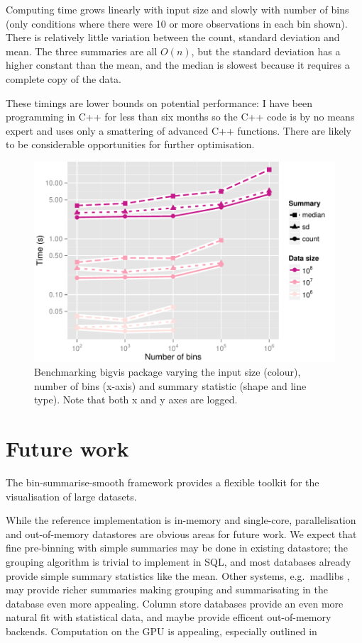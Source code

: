 \documentclass[journal]{vgtc}                %
\begin{document}
Computing time grows linearly with input size and slowly with number of bins (only conditions where there were 10 or more observations in each bin shown). There is relatively little variation between the count, standard deviation and mean. The three summaries are all $O(n)$, but the standard deviation has a higher constant than the mean, and the median is slowest because it requires a complete copy of the data. 

These timings are lower bounds on potential performance: I have been programming in C++ for less than six months so the C++ code is by no means expert and uses only a smattering of advanced C++ functions. There are likely to be considerable opportunities for further optimisation.

\begin{figure}
  \centering
   \includegraphics[width=\linewidth]{benchmark}
 \caption{Benchmarking bigvis package varying the input size (colour), number of bins (x-axis) and summary statistic (shape and line type). Note that both x and y axes are logged.}
 \label{fig:benchmark}
\end{figure}

\section{Future work}
\label{sec:conclusion}

The bin-summarise-smooth framework provides a flexible toolkit for the visualisation of large datasets. 

While the reference implementation is in-memory and single-core, parallelisation and out-of-memory datastores are obvious areas for future work. We expect that fine pre-binning with simple summaries may be done in existing datastore; the grouping algorithm is trivial to implement in SQL, and most databases already provide simple summary statistics like the mean. Other systems, e.g.\ madlibs \citep{hellerstein:2012}, may provide richer summaries making grouping and summarisating in the database even more appealing. Column store databases \citep{kersten:2011} provide an even more natural fit with statistical data, and maybe provide efficent out-of-memory backends. Computation on the GPU is appealing, especially outlined in \citep{liu:2013}
\end{document}
